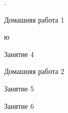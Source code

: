\begin{class}[number=2]
	\begin{listofex}
		\item .
	\end{listofex}
\end{class}

\begin{homework}[number=1]
	\begin{listofex}
		\item Домашняя работа 1
	\end{listofex}
\end{homework}

\begin{class}[number=3]
	\begin{listofex}
		\item ю
	\end{listofex}
\end{class}

\begin{class}[number=4]
	\begin{listofex}
		\item Занятие 4
	\end{listofex}
\end{class}

\begin{homework}[number=2]
	\begin{listofex}
		\item Домашняя работа 2
	\end{listofex}
\end{homework}

\begin{class}[number=5]
	\begin{listofex}
		\item Занятие 5
	\end{listofex}
\end{class}

\begin{class}[number=6]
	\begin{listofex}
		\item Занятие 6
	\end{listofex}
\end{class}

